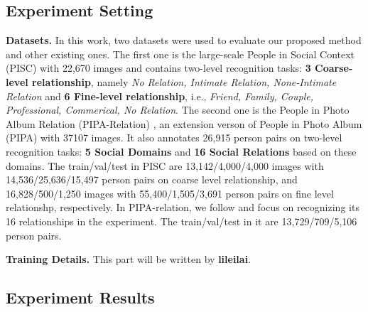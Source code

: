 \documentclass{article}
\begin{document}
\subsection{Experiment Setting}

{\bf Datasets.} In this work, two datasets were used to evaluate our proposed method and other existing ones. The first one is the large-scale People in Social Context (PISC) \cite{DBLP:conf/iccv/LiWZK17} with 22,670 images and contains two-level recognition tasks: {\bf 3 Coarse-level relationship}, namely {\it No Relation, Intimate Relation, None-Intimate Relation} and {\bf 6 Fine-level relationship}, i.e., {\it Friend, Family, Couple, Professional, Commerical, No Relation}. The second one is the People in Photo Album Relation (PIPA-Relation) \cite{DBLP:conf/cvpr/SunSF17}, an extension verson of People in Photo Album (PIPA) \cite{DBLP:conf/cvpr/ZhangPTFB15} with 37107 images. It also annotates 26,915 person pairs on two-level recognition tasks: {\bf 5 Social Domains} and {\bf 16 Social Relations} based on these domains. The train/val/test in PISC are 13,142/4,000/4,000 images with 14,536/25,636/15,497 person pairs on coarse level relationship, and 16,828/500/1,250 images with 55,400/1,505/3,691 person pairs on fine level relationshp, respectively. In PIPA-relation, we follow \cite{DBLP:conf/ijcai/WangCRYCL18} and focus on recognizing its 16 relationships in the experiment. The train/val/test in it are 13,729/709/5,106 person pairs.

{\bf Training Details.} This part will be written by {\bf lileilai}.

\subsection{Experiment Results}
\end{document}
